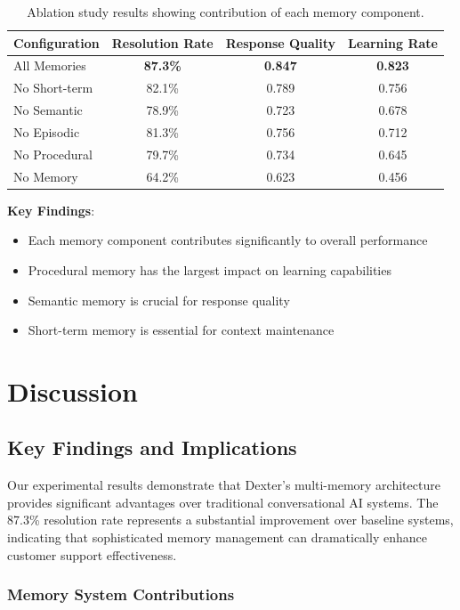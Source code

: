 \documentclass[11pt]{article}
\begin{document}
\begin{table}[H]
\centering
\begin{tabular}{@{}lccc@{}}
\toprule
Configuration & Resolution Rate & Response Quality & Learning Rate \\
\midrule
All Memories & \textbf{87.3\%} & \textbf{0.847} & \textbf{0.823} \\
No Short-term & 82.1\% & 0.789 & 0.756 \\
No Semantic & 78.9\% & 0.723 & 0.678 \\
No Episodic & 81.3\% & 0.756 & 0.712 \\
No Procedural & 79.7\% & 0.734 & 0.645 \\
No Memory & 64.2\% & 0.623 & 0.456 \\
\bottomrule
\end{tabular}
\caption{Ablation study results showing contribution of each memory component.}
\label{tab:ablation}
\end{table}

\textbf{Key Findings}:
\begin{itemize}
\item Each memory component contributes significantly to overall performance
\item Procedural memory has the largest impact on learning capabilities
\item Semantic memory is crucial for response quality
\item Short-term memory is essential for context maintenance
\end{itemize}

\section{Discussion}

\subsection{Key Findings and Implications}

Our experimental results demonstrate that Dexter's multi-memory architecture provides significant advantages over traditional conversational AI systems. The 87.3\% resolution rate represents a substantial improvement over baseline systems, indicating that sophisticated memory management can dramatically enhance customer support effectiveness.

\subsubsection{Memory System Contributions}
\end{document}
